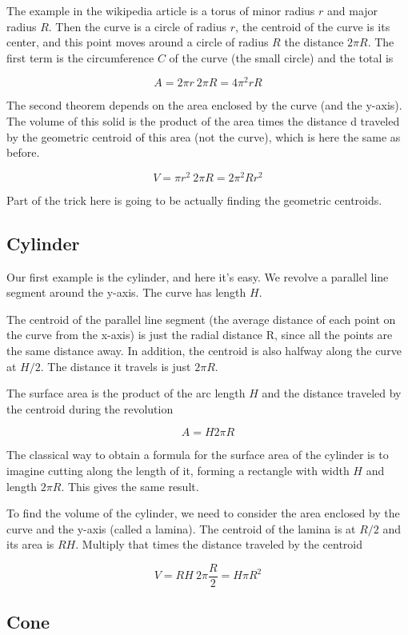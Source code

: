 \documentclass[11pt, oneside]{report}   	%
\begin{document}
The example in the wikipedia article is a torus of minor radius $r$ and major radius $R$.  Then the curve is a circle of radius $r$, the centroid of the curve is its center, and this point moves around a circle of radius $R$ the distance $2\pi R$.  The first term is the circumference $C$ of the curve (the small circle) and the total is

\[ A = 2 \pi r \ 2 \pi R = 4 \pi^2 r R \]

The second theorem depends on the area enclosed by the curve (and the y-axis).  The volume of this solid is the product of the area times the distance d traveled by the geometric centroid of this area (not the curve), which is here the same as before.

\[ V = \pi r^2 \ 2 \pi R = 2 \pi^2 R r^2 \]

Part of the trick here is going to be actually finding the geometric centroids.  

\subsection*{Cylinder}
Our first example is the cylinder, and here it's easy.  We revolve a parallel line segment around the y-axis.  The curve has length $H$.  

The centroid of the parallel line segment (the average distance of each point on the curve from the x-axis) is just the radial distance R, since all the points are the same distance away.  In addition, the centroid is also halfway along the curve at $H/2$.  The distance it travels is just $2\pi R$.

The surface area is the product of the arc length $H$ and the distance traveled by the centroid during the revolution

\[A = H 2 \pi R \]

The classical way to obtain a formula for the surface area of the cylinder is to imagine cutting along the length of it, forming a rectangle with width $H$ and length $2 \pi R$.  This gives the same result.

To find the volume of the cylinder, we need to consider the area enclosed by the curve and the y-axis (called a lamina).  The centroid of the lamina is at $R/2$ and its area is $RH$.  Multiply that times the distance traveled by the centroid

\[ V = R H \ 2 \pi \frac{R}{2} = H \pi R^2  \]

\subsection*{Cone}
\end{document}
